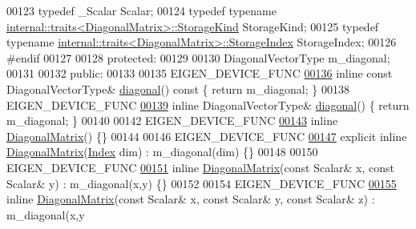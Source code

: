 \begin{DoxyCode}
00123     \textcolor{keyword}{typedef} \_Scalar Scalar;
00124     \textcolor{keyword}{typedef} \textcolor{keyword}{typename} \hyperlink{struct_eigen_1_1internal_1_1traits}{internal::traits<DiagonalMatrix>::StorageKind}
       StorageKind;
00125     \textcolor{keyword}{typedef} \textcolor{keyword}{typename} \hyperlink{struct_eigen_1_1internal_1_1traits}{internal::traits<DiagonalMatrix>::StorageIndex}
       StorageIndex;
00126 \textcolor{preprocessor}{    #endif}
00127 
00128   \textcolor{keyword}{protected}:
00129 
00130     DiagonalVectorType m\_diagonal;
00131 
00132   \textcolor{keyword}{public}:
00133 
00135     EIGEN\_DEVICE\_FUNC
\hyperlink{group___core___module_aa17bf78369fc6f541056b5b5a696f73b}{00136}     \textcolor{keyword}{inline} \textcolor{keyword}{const} DiagonalVectorType& \hyperlink{group___core___module_aa17bf78369fc6f541056b5b5a696f73b}{diagonal}()\textcolor{keyword}{ const }\{ \textcolor{keywordflow}{return} m\_diagonal; \}
00138     EIGEN\_DEVICE\_FUNC
\hyperlink{group___core___module_aea4c301c837d0af2fdab5d7d1f32c97d}{00139}     \textcolor{keyword}{inline} DiagonalVectorType& \hyperlink{group___core___module_aea4c301c837d0af2fdab5d7d1f32c97d}{diagonal}() \{ \textcolor{keywordflow}{return} m\_diagonal; \}
00140 
00142     EIGEN\_DEVICE\_FUNC
\hyperlink{group___core___module_a828c0f7d55a4f66908e76b3af1acc37f}{00143}     \textcolor{keyword}{inline} \hyperlink{group___core___module_a828c0f7d55a4f66908e76b3af1acc37f}{DiagonalMatrix}() \{\}
00144 
00146     EIGEN\_DEVICE\_FUNC
\hyperlink{group___core___module_a82e6fd9b8f7f614bc05b4f941a875d7a}{00147}     \textcolor{keyword}{explicit} \textcolor{keyword}{inline} \hyperlink{group___core___module_a82e6fd9b8f7f614bc05b4f941a875d7a}{DiagonalMatrix}(\hyperlink{group___core___module_a554f30542cc2316add4b1ea0a492ff02}{Index} dim) : m\_diagonal(dim) \{\}
00148 
00150     EIGEN\_DEVICE\_FUNC
\hyperlink{group___core___module_a1443056b287f069d6771d7945e45ad60}{00151}     \textcolor{keyword}{inline} \hyperlink{group___core___module_a1443056b287f069d6771d7945e45ad60}{DiagonalMatrix}(\textcolor{keyword}{const} Scalar& x, \textcolor{keyword}{const} Scalar& y) : m\_diagonal(x,y) \{\}
00152 
00154     EIGEN\_DEVICE\_FUNC
\hyperlink{group___core___module_aebf160f0165e6602249cbe03148f6c04}{00155}     \textcolor{keyword}{inline} \hyperlink{group___core___module_aebf160f0165e6602249cbe03148f6c04}{DiagonalMatrix}(\textcolor{keyword}{const} Scalar& x, \textcolor{keyword}{const} Scalar& y, \textcolor{keyword}{const} Scalar& z) : m\_diagonal(x,y

\end{DoxyCode}
